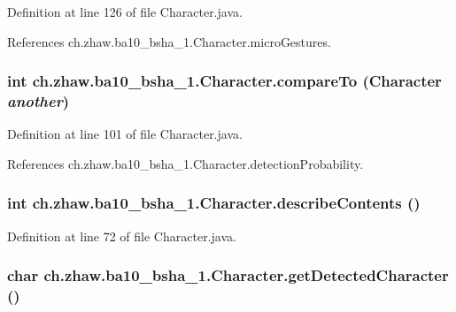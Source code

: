 Definition at line 126 of file Character.java.

References ch.zhaw.ba10\_\-bsha\_\-1.Character.microGestures.\hypertarget{classch_1_1zhaw_1_1ba10__bsha__1_1_1Character_a66cd28da88720aba5b7a441326874e65}{
\subsubsection[{compareTo}]{\setlength{\rightskip}{0pt plus 5cm}int ch.zhaw.ba10\_\-bsha\_\-1.Character.compareTo ({\bf Character} {\em another})}}
\label{classch_1_1zhaw_1_1ba10__bsha__1_1_1Character_a66cd28da88720aba5b7a441326874e65}


Definition at line 101 of file Character.java.

References ch.zhaw.ba10\_\-bsha\_\-1.Character.detectionProbability.\hypertarget{classch_1_1zhaw_1_1ba10__bsha__1_1_1Character_ae64eef9831bfc6a36a46711512f031a3}{
\subsubsection[{describeContents}]{\setlength{\rightskip}{0pt plus 5cm}int ch.zhaw.ba10\_\-bsha\_\-1.Character.describeContents ()}}
\label{classch_1_1zhaw_1_1ba10__bsha__1_1_1Character_ae64eef9831bfc6a36a46711512f031a3}


Definition at line 72 of file Character.java.\hypertarget{classch_1_1zhaw_1_1ba10__bsha__1_1_1Character_a2bcee4a4f8ab32a78d3a8d2885795c16}{
\subsubsection[{getDetectedCharacter}]{\setlength{\rightskip}{0pt plus 5cm}char ch.zhaw.ba10\_\-bsha\_\-1.Character.getDetectedCharacter ()}}
\label{classch_1_1zhaw_1_1ba10__bsha__1_1_1Character_a2bcee4a4f8ab32a78d3a8d2885795c16}


